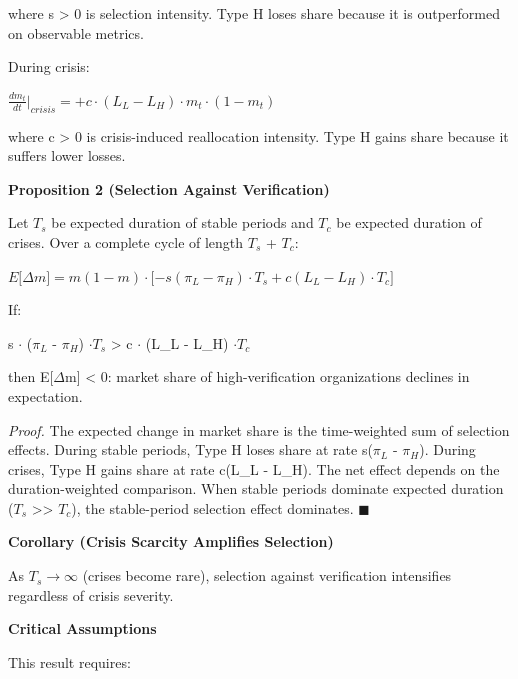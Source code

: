 \documentclass[11pt,a4paper]{article}
\begin{document}
where s > 0 is selection intensity. Type H loses share because it is outperformed on observable metrics.

During crisis:

$\frac{dm_t}{dt}\bigg|_{crisis} = +c \cdot (L_L - L_H) \cdot m_t \cdot (1 - m_t)$

where c > 0 is crisis-induced reallocation intensity. Type H gains share because it suffers lower losses.

\textbf{Proposition 2 (Selection Against Verification)}

Let $T_s$ be expected duration of stable periods and $T_c$ be expected duration of crises. Over a complete cycle of length $T_s$ + $T_c$:

$E{[}\Delta m{]} = m(1-m) \cdot {[}-s(\pi_L - \pi_H) \cdot T_s + c(L_L - L_H) \cdot T_c{]}$

If:

s $\cdot$ ($\pi_{L}$ - $\pi_{H}$) $\cdot T_s$ > c $\cdot$ (L\_L - L\_H) $\cdot T_c$

then E{[}$\Delta$m{]} < 0: market share of high-verification organizations declines in expectation.

\emph{Proof.} The expected change in market share is the time-weighted sum of selection effects. During stable periods, Type H loses share at rate s($\pi_{L}$ - $\pi_{H}$). During crises, Type H gains share at rate c(L\_L - L\_H). The net effect depends on the duration-weighted comparison. When stable periods dominate expected duration ($T_s$ \textgreater> $T_c$), the stable-period selection effect dominates. $\blacksquare$

\textbf{Corollary (Crisis Scarcity Amplifies Selection)}

As $T_s \to \infty$ (crises become rare), selection against verification intensifies regardless of crisis severity.

\textbf{Critical Assumptions}

This result requires:
\end{document}
